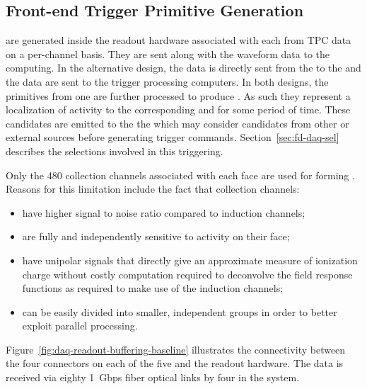 
\subsection{Front-end Trigger Primitive Generation}
\label{sec:fd-daq-fetp}


 are generated inside the  readout
hardware associated with each  from TPC data on a per-channel basis.
They are sent along with the waveform data to the  
computing.
In the alternative design, the data is directly sent from the  to
the  and the data are sent to the trigger processing
computers.  
In both designs, the primitives from one  are further
processed to produce . 
As such they represent a localization of activity to the corresponding
 and for some period of time. 
These candidates are emitted to the the  which may consider
candidates from other  or external sources before
generating trigger commands.
Section~\ref{sec:fd-daq-sel} describes the selections involved in this
triggering.

Only the \num{480} collection channels associated with each  face are
used for forming . 
Reasons for this limitation include the fact that collection
channels:

\begin{itemize}
\item have higher signal to noise ratio compared to induction channels;
\item are fully and independently sensitive to activity on their  face;
\item have unipolar signals that directly give an approximate measure
  of ionization charge without costly computation required to
  deconvolve the field response functions as required to make use of
  the induction channels;
\item can be easily divided into smaller, independent groups in order
  to better exploit parallel processing.
\end{itemize}


Figure~\ref{fig:daq-readout-buffering-baseline} illustrates the connectivity between the
four connectors on each of the five  and the  readout hardware.
The data is received via eighty \SI{1}{Gbps} fiber optical links by four 
in the   system. 

